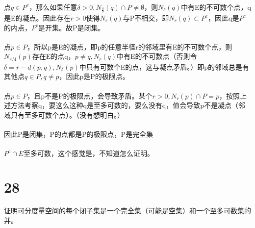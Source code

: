 \paragraph{} 点$q \in P^c$，那么如果任意$\delta > 0, N_{\frac{\delta}{2}}(q) \cap P \ne \emptyset$，则$N_{\delta}(q)$中有E的不可数个点，q是E的凝点。因此存在$r > 0$使得$N_r(q)$与P不相交，即$N_r(q) \subset P^c$，因此q是$P^c$的内点，$P^c$是开集。故P是闭集。
\paragraph{} 点$p \in P$，所以p是E的凝点，即p的任意半径r的邻域里有E的不可数个点，则$ N_{r/4}(p) $存在E的点q，$p \ne q, N_r(q)$中有E的不可数点（否则令$\delta = r - d(p,q), N_{\delta}(p)$中只有可数个E的点，这与凝点矛盾。）即p的邻域总是有其他点$q\in P, q \ne p$，因此p是P的极限点。
\paragraph{} 点$p \in P$，且p不是P的极限点，会导致矛盾。某个$r > 0, N_r(p) \cap P = p $，按照上述方法考察q，要这么这种q是至多可数的，要么没有q，值会导致p不是凝点（邻域只有至多可数个点）。（没有想明白。）
\paragraph{} 因此P是闭集，P的点都是P的极限点，P是完全集
\paragraph{} $P^c \cap E$至多可数，这个感觉是，不知道怎么证明。
\paragraph{}
\paragraph{}
\paragraph{}
\paragraph{}
\section*{28} 证明可分度量空间的每个闭子集是一个完全集（可能是空集）和一个至多可数集的并。
